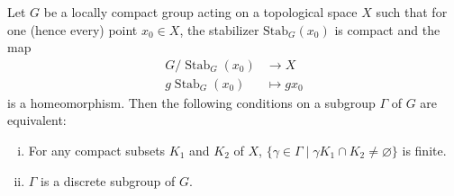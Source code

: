 \documentclass{report}
\begin{document}
\begin{proposition}{}{}
	Let $G$ be a locally compact group acting on a topological space $X$ such that for one (hence every) point $x_0 \in X$, the stabilizer $\mathrm{Stab}_G(x_0)$ is compact and the map
	$$
		\begin{aligned}
			G / \operatorname{Stab}_G(x_0) & \longrightarrow X \\
			g\operatorname{Stab}_G(x_0)    & \longmapsto g x_0
		\end{aligned}
	$$
	 is a homeomorphism. Then the following conditions on a subgroup $\Gamma$ of $G$ are equivalent: 
	 
	 \begin{enumerate}[(i)]
		\item For any compact subsets $K_1$ and $K_2$ of $X$, $\{\gamma \in \Gamma \mid \gamma K_1 \cap K_2 \neq \varnothing\}$ is finite.
		\item $\Gamma$ is a discrete subgroup of $G$. 
	 \end{enumerate}

\end{proposition}
\end{document}
